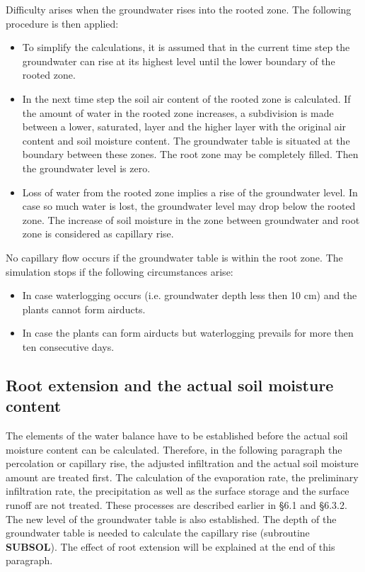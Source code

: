 Difficulty arises when the groundwater rises into the rooted zone. The following proce\-dure is 
then applied:
\begin{itemize}
\item To simplify the calculations, it is assumed that in the current time step the
  groundwater can rise at its highest level until the lower boundary of the rooted
  zone.
\item In the next time step the soil air content of the rooted zone is calculated. If the
  amount of water in the rooted zone increases, a subdivision is made between a
  lower, saturated, layer and the higher layer with the original air content and soil
  moisture content. The {\nobreak}groundwater table is situated at the boundary between these
  zones. The root zone may be completely filled. Then the groundwater level is
  zero.
\item Loss of water from the rooted zone implies a rise of the groundwater level. In
  case so much water is lost, the groundwater level may drop below the rooted
  zone. The increase of soil moisture in the zone between groundwater and root
  zone is considered as capillary rise.
\end{itemize}
 
No capillary flow occurs if the groundwater table is within the root zone. The simulation
stops if the following circumstances arise:
\begin{itemize}
\item In case waterlogging occurs (i.e. groundwater depth less then 10 cm) and the
  plants cannot form airducts.
\item In case the plants can form airducts but waterlogging prevails for more then ten
  consecutive days.
\end{itemize}

\subsection{Root extension and the actual soil moisture content  }

The elements of the water balance have to be established before the actual soil moisture
content can be calculated. Therefore, in the following paragraph the percolation or
capillary rise, the adjusted infiltration and the actual soil moisture amount are treated
first. The calculation of the evaporation rate, the preliminary infiltration rate, the
precipitation as well as the surface storage and the surface runoff are not treated. These
processes are described earlier in \S 6.1 and \S 6.3.2. The new level of the groundwater
table is also established. The depth of the groundwater table is needed to calculate the
capillary rise (subroutine {\bf SUBSOL}). The effect of root extension will be explained at the
end of this paragraph.

